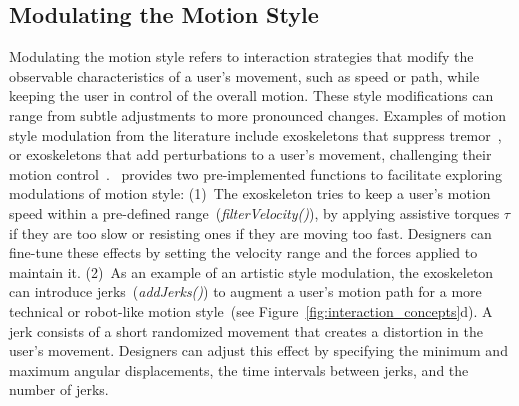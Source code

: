 \subsection{Modulating the Motion Style}

Modulating the motion style refers to interaction strategies that modify the observable characteristics of a user’s movement, such as speed or path, while keeping the user in control of the overall motion. These style modifications can range from subtle adjustments to more pronounced changes.
Examples of motion style modulation from the literature include exoskeletons that suppress tremor~\cite{lora_2021}, or exoskeletons that add perturbations to a user's movement, challenging their motion control~\cite{gasperina_2021}.
\toolkit~provides two pre-implemented functions to facilitate exploring modulations of motion style: (1)~The exoskeleton tries to keep a user's motion speed within a pre-defined range~(\textit{filterVelocity()}), by applying assistive torques $\tau$ if they are too slow or resisting ones if they are moving too fast. Designers can fine-tune these effects by setting the velocity range and the forces applied to maintain it. (2)~As an example of an artistic style modulation, the exoskeleton can introduce jerks~(\textit{addJerks()}) to augment a user's motion path for a more technical or robot-like motion style~(see Figure~\ref{fig:interaction_concepts}d). A jerk consists of a short randomized movement that creates a distortion in the user's movement. Designers can adjust this effect by specifying the minimum and maximum angular displacements, the time intervals between jerks, and the number of jerks.

